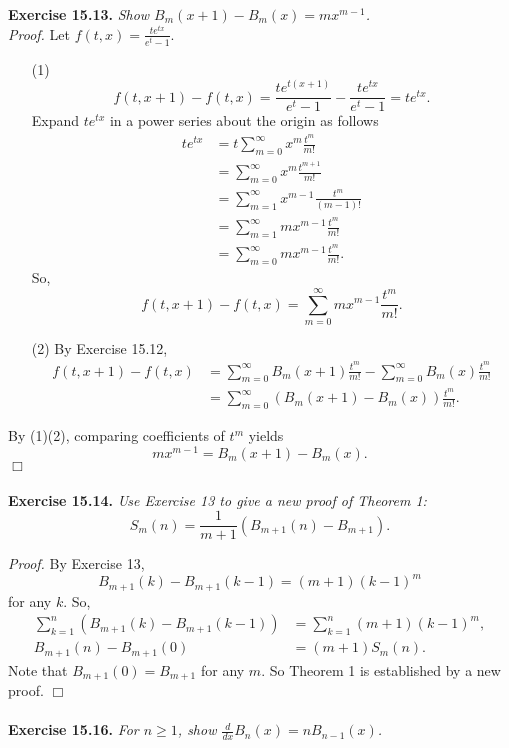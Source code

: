 \documentclass{article}
\begin{document}
\textbf{Exercise 15.13.}
\emph{Show $B_m(x+1) - B_m(x) = mx^{m-1}$.} \\

\emph{Proof.}
Let $f(t, x) = \frac{te^{tx}}{e^t - 1}$.
\begin{enumerate}
\item[(1)]
$$f(t, x+1) - f(t, x)
= \frac{te^{t(x+1)}}{e^t - 1} - \frac{te^{tx}}{e^t - 1}
= te^{tx}.$$
Expand $te^{tx}$ in a power series about the origin as follows
\begin{align*}
te^{tx}
&= t \sum_{m=0}^{\infty} x^m \frac{t^m}{m!} \\
&= \sum_{m=0}^{\infty} x^m \frac{t^{m+1}}{m!} \\
&= \sum_{m=1}^{\infty} x^{m-1} \frac{t^m}{(m-1)!} \\
&= \sum_{m=1}^{\infty} mx^{m-1} \frac{t^m}{m!} \\
&= \sum_{m=0}^{\infty} mx^{m-1} \frac{t^m}{m!}.
\end{align*}
So,
$$f(t, x+1) - f(t, x) = \sum_{m=0}^{\infty} mx^{m-1} \frac{t^m}{m!}.$$
\item[(2)]
By Exercise 15.12,
\begin{align*}
f(t, x+1) - f(t, x)
&= \sum_{m=0}^{\infty} B_m(x+1) \frac{t^m}{m!}
- \sum_{m=0}^{\infty} B_m(x) \frac{t^m}{m!} \\
&= \sum_{m=0}^{\infty} (B_m(x+1) - B_m(x)) \frac{t^m}{m!}.
\end{align*}
\end{enumerate}
By (1)(2), comparing coefficients of $t^m$ yields
$$mx^{m-1} = B_m(x+1) - B_m(x).$$
$\Box$ \\\\



\textbf{Exercise 15.14.}
\emph{Use Exercise 13 to give a new proof of Theorem 1:
$$S_m(n) = \frac{1}{m+1}(B_{m+1}(n) - B_{m+1}).$$}

\emph{Proof.}
By Exercise 13,
$$B_{m+1}(k) - B_{m+1}(k-1) = (m+1)(k-1)^m$$
for any $k$.
So,
\begin{align*}
\sum_{k=1}^{n} (B_{m+1}(k) - B_{m+1}(k-1))
&= \sum_{k=1}^{n} (m+1)(k-1)^m, \\
B_{m+1}(n) - B_{m+1}(0)
&= (m+1)S_m(n).
\end{align*}
Note that $B_{m+1}(0) = B_{m+1}$ for any $m$.
So Theorem 1 is established by a new proof.
$\Box$ \\\\



\textbf{Exercise 15.16.}
\emph{For $n \geq 1$, show $\frac{d}{dx}B_n(x) = nB_{n-1}(x)$.} \\
\end{document}
